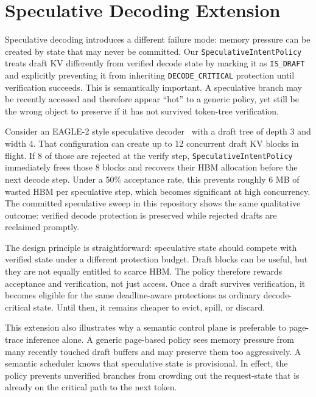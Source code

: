 \documentclass[10pt,twocolumn]{article}
\begin{document}
\section{Speculative Decoding Extension}
\label{sec:spec}

Speculative decoding introduces a different failure mode: memory pressure can be created by state that may never be committed. Our \texttt{SpeculativeIntentPolicy} treats draft KV differently from verified decode state by marking it as \texttt{IS\_DRAFT} and explicitly preventing it from inheriting \texttt{DECODE\_CRITICAL} protection until verification succeeds. This is semantically important. A speculative branch may be recently accessed and therefore appear ``hot'' to a generic policy, yet still be the wrong object to preserve if it has not survived token-tree verification.

Consider an EAGLE-2 style speculative decoder~\cite{eagle} with a draft tree of depth 3 and width 4. That configuration can create up to 12 concurrent draft KV blocks in flight. If 8 of those are rejected at the verify step, \texttt{SpeculativeIntentPolicy} immediately frees those 8 blocks and recovers their HBM allocation before the next decode step. Under a 50\% acceptance rate, this prevents roughly 6 MB of wasted HBM per speculative step, which becomes significant at high concurrency. The committed speculative sweep in this repository shows the same qualitative outcome: verified decode protection is preserved while rejected drafts are reclaimed promptly.

The design principle is straightforward: speculative state should compete with verified state under a different protection budget. Draft blocks can be useful, but they are not equally entitled to scarce HBM. The policy therefore rewards acceptance and verification, not just access. Once a draft survives verification, it becomes eligible for the same deadline-aware protections as ordinary decode-critical state. Until then, it remains cheaper to evict, spill, or discard.

This extension also illustrates why a semantic control plane is preferable to page-trace inference alone. A generic page-based policy sees memory pressure from many recently touched draft buffers and may preserve them too aggressively. A semantic scheduler knows that speculative state is provisional. In effect, the policy prevents unverified branches from crowding out the request-state that is already on the critical path to the next token.
\end{document}

